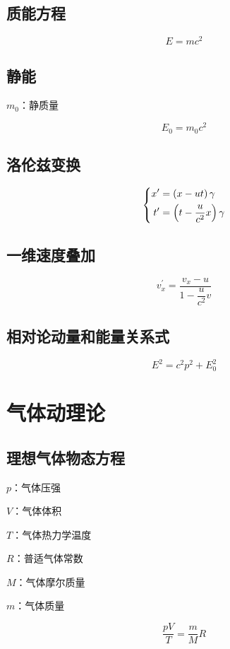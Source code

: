 \documentclass{article}
\begin{document}
\subsection{质能方程}

\[E=mc^2\]

\subsection{静能}

$m_0$：静质量

\[E_0=m_0c^2\]

\subsection{洛伦兹变换}

\[\left\{\begin{aligned}
        x^\prime & =\left(x-ut\right)\gamma            \\
        t^\prime & =\left(t-\frac u{c^2}x\right)\gamma
    \end{aligned}\right.\]

\subsection{一维速度叠加}

\[v_x^\prime=\frac{v_x-u}{1-\dfrac u{c^2}v}\]

\subsection{相对论动量和能量关系式}

\[E^2=c^2p^2+E_0^2\]

\section{气体动理论}

\subsection{理想气体物态方程}

$p$：气体压强

$V$：气体体积

$T$：气体热力学温度

$R$：普适气体常数

$M$：气体摩尔质量

$m$：气体质量

\[\frac{pV}T=\frac mMR\]
\end{document}
